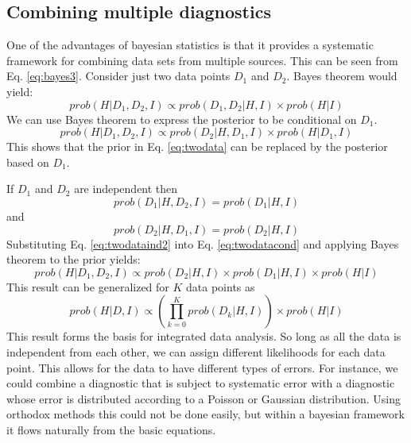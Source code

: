 \documentclass[12pt]{article}
\numberwithin{equation}{section}
\begin{document}
\subsection{Combining multiple diagnostics}
One of the advantages of bayesian statistics is that it provides a systematic framework for combining data sets from multiple sources. 
This can be seen from Eq. \ref{eq:bayes3}. Consider just two data points $D_1$ and $D_2$. Bayes theorem would yield:
\begin{equation} \label{eq:twodata}
	prob(H|D_1,D_2,I) \propto prob(D_1,D_2|H,I) \times prob(H|I)
\end{equation}
We can use Bayes theorem to express the posterior to be conditional on $D_1$.
\begin{equation} \label{eq:twodatacond}
	prob(H|D_1,D_2,I) \propto prob(D_2|H,D_1,I) \times prob(H|D_1,I)
\end{equation}
This shows that the prior in Eq. \ref{eq:twodata} can be replaced by the posterior based on $D_1$. 

If $D_1$ and $D_2$ are independent then
\begin{equation} \label{eq:twodataind1}
	prob(D_1|H,D_2,I) = prob(D_1|H,I)
\end{equation}
and
\begin{equation} \label{eq:twodataind2}
	prob(D_2|H,D_1,I) = prob(D_2|H,I)
\end{equation}
Substituting Eq. \ref{eq:twodataind2} into Eq. \ref{eq:twodatacond} and applying Bayes theorem to the prior yields:
\begin{equation} \label{eq:twodataexpand}
	prob(H|D_1,D_2,I) \propto prob(D_2|H,I) \times prob(D_1|H,I) \times prob(H|I)
\end{equation}
This result can be generalized for $K$ data points as 
\begin{equation} \label{eq:IDA}
	{prob(H|D,I)} \propto {\left( \prod\limits_{k=0}^K{prob(D_k|H,I)}\right)} \times {prob(H|I)}
\end{equation}
This result forms the basis for integrated data analysis. So long as all the data is independent from each other, we can assign 
different likelihoods for each data point. This allows for the data to have different types of errors. For instance, we could combine 
a diagnostic that is subject to systematic error with a diagnostic whose error is distributed according to a Poisson or Gaussian 
distribution. Using orthodox methods this could not be done easily, but within a bayesian framework it flows naturally from the 
basic equations. 
\end{document}
